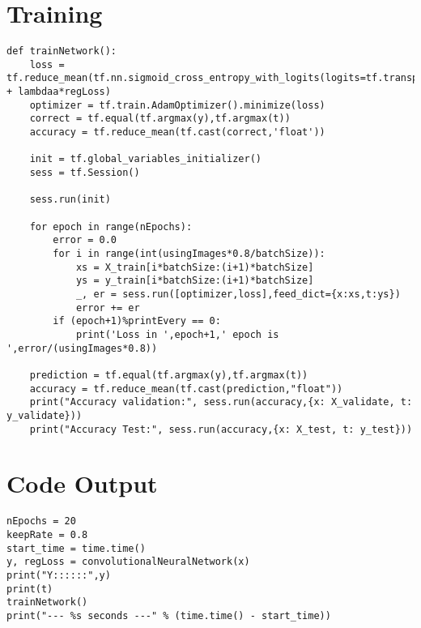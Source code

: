 \documentclass[a4paper,11pt]{article}
\begin{document}
\section*{Training}

\begin{lstlisting}[label={list:second}]
def trainNetwork():
	loss = tf.reduce_mean(tf.nn.sigmoid_cross_entropy_with_logits(logits=tf.transpose(y),labels=tf.transpose(t)) + lambdaa*regLoss)
	optimizer = tf.train.AdamOptimizer().minimize(loss)
	correct = tf.equal(tf.argmax(y),tf.argmax(t))
	accuracy = tf.reduce_mean(tf.cast(correct,'float'))
	
	init = tf.global_variables_initializer()
	sess = tf.Session()
	
	sess.run(init)
	
	for epoch in range(nEpochs):
		error = 0.0
		for i in range(int(usingImages*0.8/batchSize)):
			xs = X_train[i*batchSize:(i+1)*batchSize]
			ys = y_train[i*batchSize:(i+1)*batchSize]
			_, er = sess.run([optimizer,loss],feed_dict={x:xs,t:ys})
			error += er
		if (epoch+1)%printEvery == 0:
			print('Loss in ',epoch+1,' epoch is ',error/(usingImages*0.8))
	
	prediction = tf.equal(tf.argmax(y),tf.argmax(t))
	accuracy = tf.reduce_mean(tf.cast(prediction,"float"))
	print("Accuracy validation:", sess.run(accuracy,{x: X_validate, t: y_validate}))
	print("Accuracy Test:", sess.run(accuracy,{x: X_test, t: y_test}))
\end{lstlisting}

\vfill
\section*{Code Output}
\begin{lstlisting}[label={list:fifth},caption=Code]
nEpochs = 20
keepRate = 0.8
start_time = time.time()
y, regLoss = convolutionalNeuralNetwork(x)
print("Y::::::",y)
print(t)
trainNetwork()
print("--- %s seconds ---" % (time.time() - start_time))
\end{lstlisting}
\end{document}
